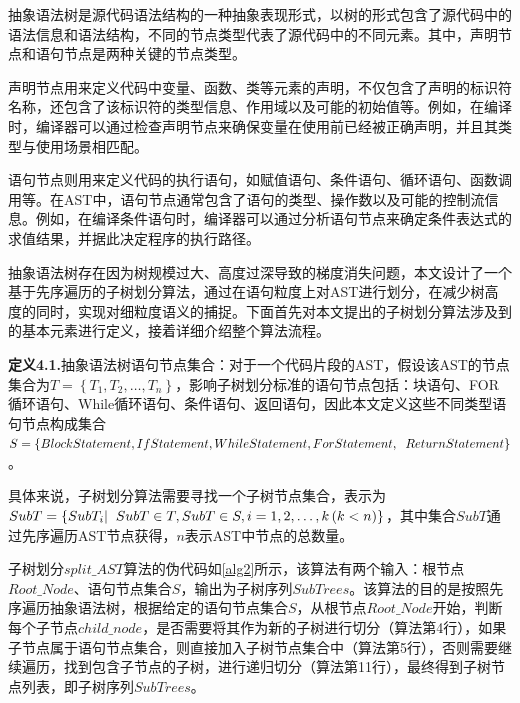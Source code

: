 抽象语法树是源代码语法结构的一种抽象表现形式，以树的形式包含了源代码中的语法信息和语法结构，不同的节点类型代表了源代码中的不同元素。其中，声明节点和语句节点是两种关键的节点类型\cite{Jo2021TwoPassTF}。

声明节点用来定义代码中变量、函数、类等元素的声明，不仅包含了声明的标识符名称，还包含了该标识符的类型信息、作用域以及可能的初始值等。例如，在编译时，编译器可以通过检查声明节点来确保变量在使用前已经被正确声明，并且其类型与使用场景相匹配。

语句节点则用来定义代码的执行语句，如赋值语句、条件语句、循环语句、函数调用等。在AST中，语句节点通常包含了语句的类型、操作数以及可能的控制流信息。例如，在编译条件语句时，编译器可以通过分析语句节点来确定条件表达式的求值结果，并据此决定程序的执行路径\cite{9534099}。

抽象语法树存在因为树规模过大、高度过深导致的梯度消失问题，本文设计了一个基于先序遍历的子树划分算法，通过在语句粒度上对AST进行划分，在减少树高度的同时，实现对细粒度语义的捕捉。下面首先对本文提出的子树划分算法涉及到的基本元素进行定义，接着详细介绍整个算法流程。

\textbf{定义4.1.}抽象语法树语句节点集合：对于一个代码片段的AST，假设该AST的节点集合为$T = \left\{T_1,T_2,\ldots,T_n\right\}$，影响子树划分标准的语句节点包括：块语句、FOR循环语句、While循环语句、条件语句、返回语句，因此本文定义这些不同类型语句节点构成集合$S = \left\{BlockStatement,IfStatement,WhileStatement,ForStatement,\notag \right.\\\left.ReturnStatement\right\}$。

具体来说，子树划分算法需要寻找一个子树节点集合，表示为$SubT = \left\{SubT_i |\notag \right.\\\left. SubT \in T, SubT \in S,i=1,2,\ldots,k\left(k<n\right)\right\}$，其中集合$SubT$通过先序遍历AST节点获得，$n$表示AST中节点的总数量。

子树划分$split\_AST$算法的伪代码如\ref{alg2}所示，该算法有两个输入：根节点$Root\_Node$、语句节点集合$S$，输出为子树序列$SubTrees$。该算法的目的是按照先序遍历抽象语法树，根据给定的语句节点集合$S$，从根节点$Root\_Node$开始，判断每个子节点$child\_node$，是否需要将其作为新的子树进行切分（算法第4行），如果子节点属于语句节点集合，则直接加入子树节点集合中（算法第5行），否则需要继续遍历，找到包含子节点的子树，进行递归切分（算法第11行），最终得到子树节点列表，即子树序列$SubTrees$。

